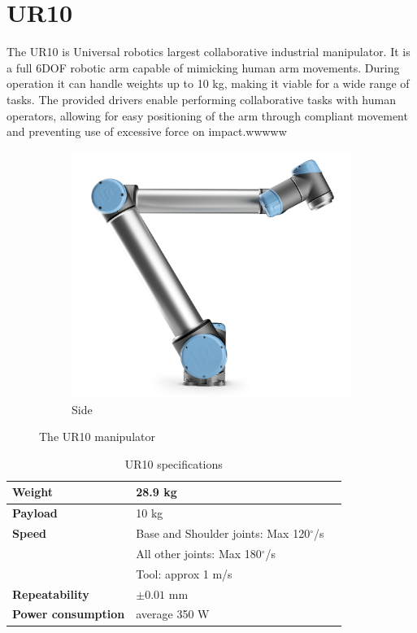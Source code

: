 \documentclass[times, utf8, diplomski, english]{fer}
\begin{document}
\section{UR10} 
The UR10 is Universal robotics largest collaborative industrial manipulator.
It is a full 6DOF robotic arm capable of mimicking human arm movements.
During operation it can handle weights up to 10 kg, making it viable for a wide range of tasks.
The provided drivers enable performing collaborative tasks with human operators, allowing for easy positioning of the arm through compliant movement and preventing use of excessive force on impact.wwwww
\begin{figure}[h]
    \centering
    \begin{subfigure}[t]{0.34\textwidth}
        \includegraphics[width=\textwidth]{ur10_right}
        \caption{Side}
    \end{subfigure}
    \caption{The UR10 manipulator}\label{fig:ur10}
\end{figure}
\begin{table}[]
\centering
\caption{UR10 specifications}
\label{table:ur10 specs}
\begin{tabular}{@{}lll@{}}
\toprule
\textbf{Weight}&  28.9 kg& \\ \midrule
\textbf{Payload}&  10 kg&  \\ \midrule
\textbf{Speed}&  Base and Shoulder joints: Max 120$^{\circ}$/s&  \\
&  All other joints: Max 180$^{\circ}$/s&   \\
&  Tool: approx 1 m/s& \\ \midrule
\textbf{Repeatability}& $\pm0.01$ mm& \\ \midrule
\textbf{Power consumption}& average 350 W& \\ \bottomrule
\end{tabular}
\end{table}
\end{document}
